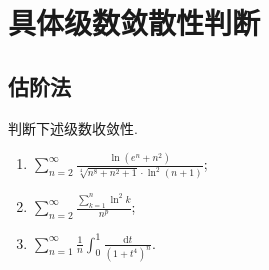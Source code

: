 \documentclass[../../main.tex]{subfiles}
\begin{document}
\section{具体级数敛散性判断}

\subsection{估阶法}

\begin{example}
判断下述级数收敛性.
\begin{enumerate}
\item \( \sum_{n = 2}^{\infty} \frac{\ln \left( e^n + n^2 \right)}{\sqrt[4]{n^8 + n^2 + 1} \cdot \ln^2 (n + 1)} \);

\item \( \sum_{n = 2}^{\infty} \frac{\sum\limits_{k = 1}^{n} \ln^2 k}{n^p} \);

\item \( \sum_{n = 1}^{\infty} \frac{1}{n} \int_{0}^{1} \frac{\mathrm{d}t}{\left( 1 + t^4 \right)^n} \).
\end{enumerate}
\end{example}
\end{document}
